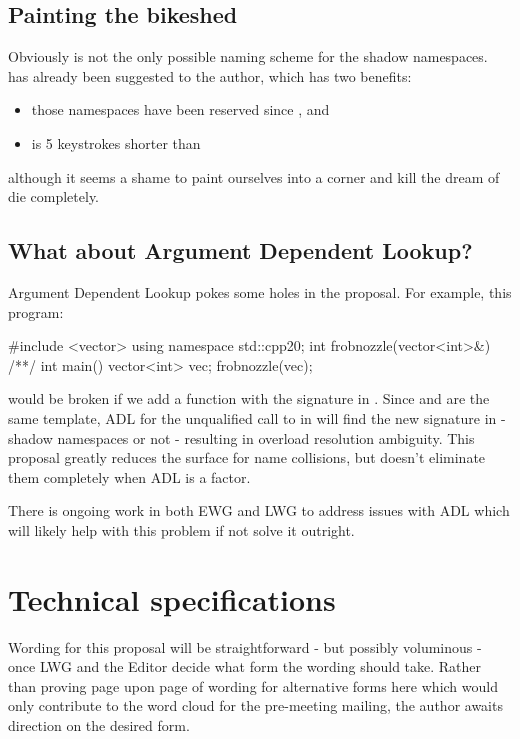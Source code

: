 \section{Painting the bikeshed}
Obviously  is not the only possible naming scheme for the
shadow namespaces.  has already been suggested to the author,
which has two benefits:
\begin{itemize}
\item those namespaces have been reserved since , and
\item {} is 5 keystrokes shorter than
\end{itemize}
although it seems a shame to paint ourselves into a corner and kill the dream
of  die completely.

\section{What about Argument Dependent Lookup?}
Argument Dependent Lookup pokes some holes in the
proposal. For example, this  program:
\begin{codeblock}
#include <vector>
using namespace std::cpp20;
int frobnozzle(vector<int>&) { /**/ }
int main() {
  vector<int> vec;
  frobnozzle(vec);
}
\end{codeblock}
would be broken if we add a function with the signature
 in . Since
 and  are the same template, ADL
for the unqualified call to  in  will find the
new signature in  - shadow namespaces or not - resulting in overload
resolution ambiguity. This proposal greatly reduces the surface for name
collisions, but doesn't eliminate them completely when ADL is a factor.

There is ongoing work in both EWG and LWG to address issues with ADL which will
likely help with this problem if not solve it outright.


\chapter{Technical specifications}
Wording for this proposal will be straightforward - but possibly voluminous -
once LWG and the Editor decide what form the wording should take. Rather than
proving page upon page of wording for alternative forms here which would only
contribute to the word cloud for the pre-meeting mailing, the author awaits
direction on the desired form.
